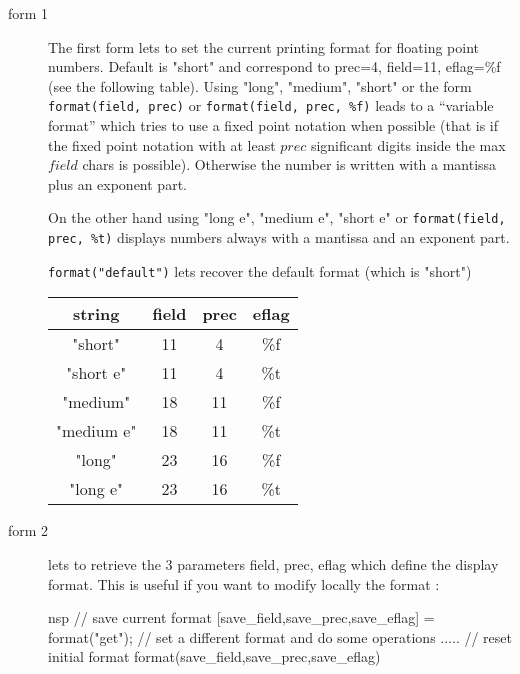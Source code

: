   \begin{mandescription}
  \begin{description}
  \item[form 1]  The first form lets to set the current printing format for floating point
    numbers. Default is "short" and correspond to prec=4, field=11, eflag=\%f (see the following
    table). Using  "long", "medium", "short" or the form \verb+format(field, prec)+
    or \verb+format(field, prec, %f)+ leads to a ``variable format'' 
    which tries to use a fixed point notation when possible (that
    is if the fixed point notation with at least $prec$ significant digits
    inside the max $field$ chars is possible). Otherwise the number is
    written with a mantissa plus an exponent part.

    On the other hand using  "long e", "medium e", "short e" or
     \verb+format(field, prec, %t)+  displays numbers always
    with a mantissa and an exponent part.

    \verb+format("default")+ lets recover the default format (which is "short")

  \begin{tabular}{|c|c|c|c|}
     string  & field & prec & eflag \\
  \hline
   "short"   & 11    & 4    &  \%f \\
   "short e" & 11    & 4    &  \%t \\
   "medium"  & 18    & 11   &  \%f \\
   "medium e"& 18    & 11   &  \%t \\
   "long"    & 23    & 16   &  \%f \\
   "long e"  & 23    & 16   &  \%t \\
   \end{tabular}

  \item[form 2] lets to retrieve the 3 parameters field, prec, eflag which define the display format.
      This is useful if you want to modify locally the format :
\begin{mintednsp}{nsp}
// save current format
[save_field,save_prec,save_eflag] = format("get");
// set a different format and do some operations
.....
// reset initial format
format(save_field,save_prec,save_eflag)
\end{mintednsp}
      
  \end{description} 
    
  \end{mandescription}

